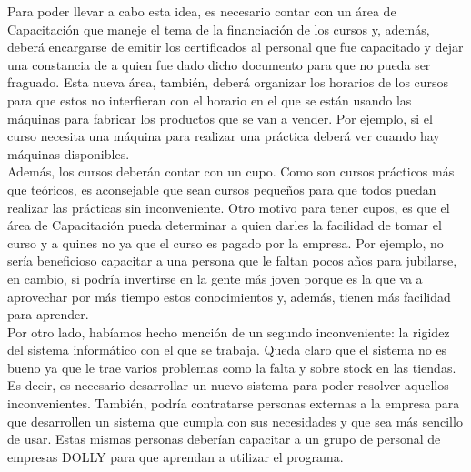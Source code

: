 \documentclass[a4paper,10pt,titlepage]{article}
\begin{document}
		\indent Para poder llevar a cabo esta idea, es necesario contar con un área de Capacitación que maneje el tema de la financiación de los cursos y, además, deberá encargarse de emitir los certificados al personal que fue capacitado y dejar una constancia de a quien fue dado dicho documento para que no pueda ser fraguado. Esta nueva área, también, deberá organizar los horarios de los cursos para que estos no interfieran con el horario en el que se están usando las máquinas para fabricar los productos que se van a vender.  Por ejemplo, si el curso necesita una máquina para realizar una práctica deberá ver cuando hay máquinas disponibles.\\
		\indent Además, los cursos deberán contar con un cupo. Como son cursos prácticos más que teóricos, es aconsejable que sean cursos pequeños para que todos puedan realizar las prácticas sin inconveniente. Otro motivo para tener cupos, es que el área de Capacitación pueda determinar a quien darles la facilidad de tomar el curso y a quines no ya que el curso es pagado por la empresa. Por ejemplo, no sería beneficioso capacitar a una persona que le faltan pocos años para jubilarse, en cambio, si podría invertirse en la gente más joven porque es la que va a aprovechar por más tiempo estos conocimientos y, además, tienen más facilidad para aprender. \\
		\indent Por otro lado, habíamos hecho mención de un segundo inconveniente: la rigidez del sistema informático con el que se trabaja. Queda claro que el sistema no es bueno ya que le trae varios problemas como la falta y sobre stock en las tiendas. Es decir, es necesario desarrollar un nuevo sistema para poder resolver aquellos inconvenientes. También, podría contratarse personas externas a la empresa para que desarrollen un sistema que cumpla con sus necesidades y que sea más sencillo de usar. Estas mismas personas deberían capacitar a un grupo de personal de empresas DOLLY para que aprendan a utilizar el programa.\\
	\vspace{0.5cm}
\end{document}
